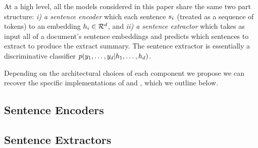 

At a high level, all the models considered in this paper share the same two part structure: 
\textit{i) a sentence encoder} which each sentence $s_i$ (treated as a sequence of tokens) to 
an embedding $h_i \in \mathcal{R}^d$,  and 
\textit{ii) a sentence extractor} which takes as input all of a document's 
sentence embeddings and predicts which sentences to extract to produce the 
extract summary. The sentence extractor is essentially a discriminative 
classifier $p(y_1, \ldots, y_{d}| h_1, \ldots, h_{d})$.

Depending on the architectural choices of each component we propose we 
can recover the specific implementations of \cite{cheng&lapata} and 
\cite{nallapati}, which we outline below.

\subsection{Sentence Encoders}


\subsection{Sentence Extractors}



